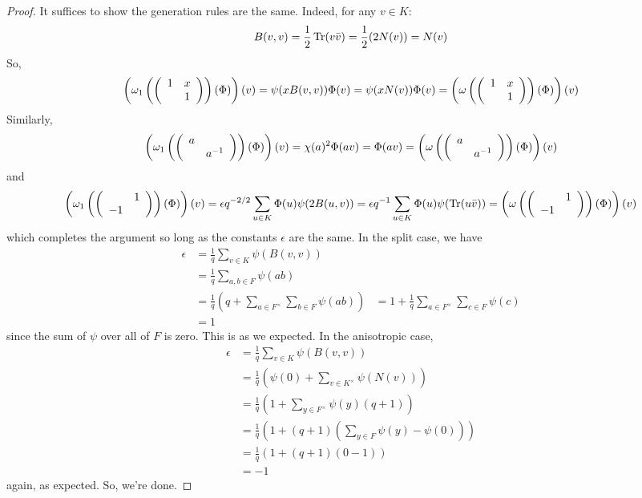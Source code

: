 \begin{proof}
	It suffices to show the generation rules are the same. Indeed, for any $v \in K$:
	\[ B(v,v) = \frac{1}{2}\operatorname{Tr}(v\bar{v}) = \frac{1}{2}(2N(v)) = N(v) \]
	So,
	\[ \left(\omega_1\left(\left(\begin{array}{cc} 1 & x \\  & 1 \end{array}\right)\right)(\Phi)\right)(v) = \psi(xB(v,v))\Phi(v) = \psi(xN(v))\Phi(v) = \left(\omega\left(\left(\begin{array}{cc} 1 & x \\  & 1 \end{array}\right)\right)(\Phi)\right)(v) \]
	Similarly,
	\[ \left(\omega_1\left(\left(\begin{array}{cc} a &  \\  & a^{-1} \end{array}\right)\right)(\Phi)\right)(v) = \chi(a)^2\Phi(av) = \Phi(av) = \left(\omega\left(\left(\begin{array}{cc} a &  \\  & a^{-1} \end{array}\right)\right)(\Phi)\right)(v) \]
	and
	\[ \left(\omega_1\left(\left(\begin{array}{cc}  & 1 \\ -1 &  \end{array}\right)\right)(\Phi)\right)(v) = \epsilon q^{-2/2}\sum_{u \in K} \Phi(u)\psi(2B(u,v)) = \epsilon q^{-1}\sum_{u \in K} \Phi(u)\psi(\operatorname{Tr}(u\bar{v})) = \left(\omega\left(\left(\begin{array}{cc}  & 1 \\ -1 &  \end{array}\right)\right)(\Phi)\right)(v) \]
	which completes the argument so long as the constants $\epsilon$ are the same. In the split case, we have
	\begin{align*}
	\epsilon
		&= \frac{1}{q}\sum_{v \in K} \psi(B(v,v)) \\
		&= \frac{1}{q}\sum_{a,b \in F} \psi(ab) \\
		&= \frac{1}{q}\left(q + \sum_{a \in F^\times} \sum_{b \in F} \psi(ab)\right)
		&= 1 + \frac{1}{q}\sum_{a \in F^\times} \sum_{c \in F} \psi(c) \\
		&= 1
	\end{align*}
	since the sum of $\psi$ over all of $F$ is zero. This is as we expected. In the anisotropic case,
	\begin{align*}
	\epsilon
		&= \frac{1}{q}\sum_{v \in K} \psi(B(v,v)) \\
		&= \frac{1}{q}\left(\psi(0) + \sum_{v \in K^\times} \psi(N(v))\right) \\
		&= \frac{1}{q}\left(1+\sum_{y \in F^\times} \psi(y)(q+1)\right) \\
		&= \frac{1}{q}\left(1+(q+1)\left(\sum_{y \in F} \psi(y) - \psi(0)\right)\right) \\
		&= \frac{1}{q}(1+(q+1)(0-1)) \\
		&= -1
	\end{align*}
	again, as expected. So, we're done.
\end{proof}
